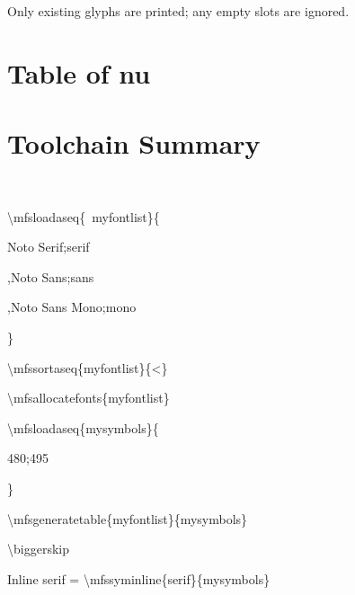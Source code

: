 \documentclass[12pt]{ltxguidex}
\newcommand\cmd[1]{\textbackslash #1}
\newcommand{\varval}[1]{\mbox{\ttfamily\color{blue} #1}}
\begin{document}
Only existing glyphs are printed; any empty slots are ignored.



\biggerskip
\section{Table of nu}



\section{Toolchain Summary}

%
%
%
%
%




\ \begin{minipage}[t]{0.42\linewidth}\ttfamily
\cmd{mfsloadaseq}\{\varval{myfontlist}\}\{\par
Noto Serif;serif\par
,Noto Sans;sans\par
,Noto Sans Mono;mono\par
\}\par
\cmd{mfssortaseq}\{myfontlist\}\{<\}\par
\cmd{mfsallocatefonts}\{myfontlist\}\par
\cmd{mfsloadaseq}\{mysymbols\}\{\par
480;495\par
\}\par
\cmd{mfsgeneratetable}\{myfontlist\}\{mysymbols\}\par

\biggerskip
\cmd{biggerskip}\par
Inline serif = \cmd{mfssyminline}\{serif\}\{mysymbols\}
\end{minipage}
\ \hfill{}
\end{document}
